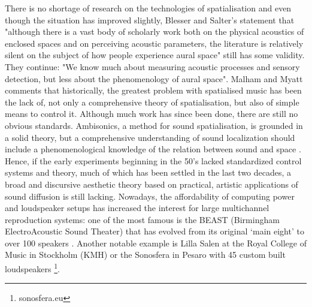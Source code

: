 \documentclass{article}
\begin{document}
There is no shortage of research on the technologies of spatialisation and even though the situation has improved slightly, Blesser and Salter's statement that "although there is a vast body of scholarly work both on the physical acoustics of enclosed spaces and on perceiving acoustic parameters, the literature is relatively silent on the subject of how people experience aural space" still has some validity. They continue: "We know much about measuring acoustic processes and sensory detection, but less about the phenomenology of aural space"\cite{Blesser2009}. Malham and Myatt comments that historically, the greatest problem with spatialised music has been the lack of, not only a comprehensive theory of spatialisation, but also of simple means to control it. Although much work has since been done, there are still no obvious standards\cite{Malham1995}. Ambisonics, a method for sound spatialisation, is grounded in a solid theory, but a comprehensive understanding of sound localization should include a phenomenological knowledge of the relation between sound and space \cite{Barrett2010, Malham1995, Travis2009}. 
Hence, if the early experiments beginning in the 50's lacked standardized control systems and theory, much of which has been settled in the last two decades, a broad and discursive aesthetic theory based on practical, artistic applications of sound diffusion is still lacking.
Nowadays, the affordability of computing power and loudspeaker setups has increased the interest for large multichannel reproduction systems: one of the most famous is the BEAST (Birmingham ElectroAcoustic Sound Theater) that has evolved from its original ‘main eight’ to over 100 speakers \cite{Wilson_Harrison_2010}. Another notable example is Lilla Salen at the Royal College of Music in Stockholm (KMH) or the Sonosfera in Pesaro with 45 custom built loudspeakers \footnote{sonosfera.eu}.
\end{document}
